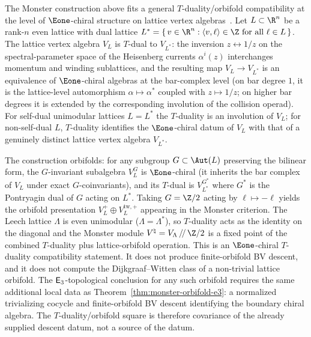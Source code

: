 \begin{remark}
\label{rem:t-duality-lattice-voa}
The Monster construction above fits a general
$T$-duality/orbifold compatibility at the level of
$\Eone$-chiral structure on lattice vertex
algebras~\cite{FLM88,Borcherds92}. Let
$L \subset \R^n$ be a rank-$n$ even lattice with dual
lattice $L^* = \{\,v \in \R^n : \langle v, \ell \rangle \in \Z
\text{ for all } \ell \in L\,\}$. The lattice vertex algebra
$V_L$ is $T$-dual to $V_{L^*}$: the inversion
$z \leftrightarrow 1/z$ on the spectral-parameter space of
the Heisenberg currents $\alpha^i(z)$ interchanges momentum
and winding sublattices, and the resulting map
$V_L \to V_{L^*}$ is an equivalence of
$\Eone$-chiral algebras at the bar-complex level (on bar
degree $1$, it is the lattice-level automorphism
$\alpha \mapsto \alpha^*$ coupled with $z \mapsto 1/z$; on
higher bar degrees it is extended by the corresponding
involution of the collision operad). For self-dual
unimodular lattices $L = L^*$ the $T$-duality is an
involution of $V_L$; for non-self-dual $L$, $T$-duality
identifies the $\Eone$-chiral datum of $V_L$ with that of a
genuinely distinct lattice vertex algebra $V_{L^*}$.

The construction orbifolds: for any subgroup
$G \subset \Aut(L)$ preserving the bilinear form, the
$G$-invariant subalgebra $V_L^G$ is $\Eone$-chiral (it
inherits the bar complex of $V_L$ under exact
$G$-coinvariants), and its $T$-dual is $V_{L^*}^{G^*}$ where
$G^*$ is the Pontryagin dual of $G$ acting on $L^*$. Taking
$G = \Z/2$ acting by $\ell \mapsto -\ell$ yields the
orbifold presentation $V_L^{+} \oplus V_L^{\mathrm{tw},+}$
appearing in the Monster criterion. The Leech lattice $\Lambda$ is
even unimodular
($\Lambda = \Lambda^*$), so $T$-duality acts as the identity
on the diagonal and the Monster module
$V^\natural = V_\Lambda \,/\!/\, \Z/2$ is a fixed point of
the combined $T$-duality plus lattice-orbifold operation.
This is an $\Eone$-chiral $T$-duality compatibility statement. It does
not produce finite-orbifold BV descent, and it does not compute the
Dijkgraaf--Witten class of a non-trivial lattice orbifold. The
$\mathsf{E}_3$-topological conclusion for any such orbifold requires the
same additional local data as Theorem~\ref{thm:monster-orbifold-e3}: a
normalized trivializing cocycle and finite-orbifold BV descent
identifying the boundary chiral algebra. The $T$-duality/orbifold
square is therefore covariance of the already supplied descent datum,
not a source of the datum.
\end{remark}

